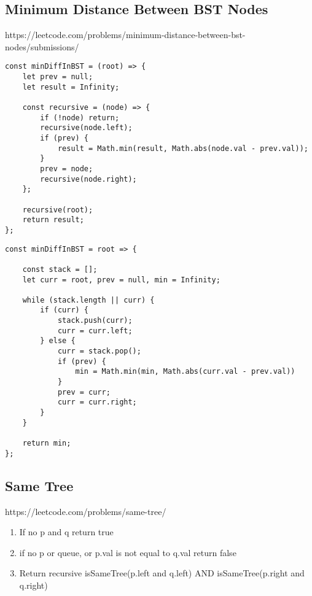 \documentclass[10pt]{article}
\begin{document}
\subsection {Minimum Distance Between BST Nodes}
https://leetcode.com/problems/minimum-distance-between-bst-nodes/submissions/

\begin{lstlisting}[title=Solution minDiffInBST, captionpos=t]
const minDiffInBST = (root) => {
    let prev = null;
    let result = Infinity;
    
    const recursive = (node) => {
        if (!node) return;
        recursive(node.left);
        if (prev) {
            result = Math.min(result, Math.abs(node.val - prev.val));
        }
        prev = node;
        recursive(node.right);
    };
    
    recursive(root);
    return result;
};
\end{lstlisting}


\begin{lstlisting}[title=Solution minDiffInBST Iterative, captionpos=t]
const minDiffInBST = root => {
    
    const stack = [];
    let curr = root, prev = null, min = Infinity;
    
    while (stack.length || curr) {
        if (curr) {
            stack.push(curr);
            curr = curr.left;
        } else {
            curr = stack.pop();
            if (prev) {
                min = Math.min(min, Math.abs(curr.val - prev.val))
            }
            prev = curr;		
            curr = curr.right;
        }
    }
    
    return min;
};\end{lstlisting}

\medskip %






\pagebreak
\medskip   
\subsection {Same Tree}
https://leetcode.com/problems/same-tree/

\begin{enumerate}
	\item If no p and q return true
	\item if no p or queue, or p.val is not equal to q.val return false
	\item Return recursive isSameTree(p.left and q.left) AND isSameTree(p.right and q.right)
\end{enumerate}
\end{document}
